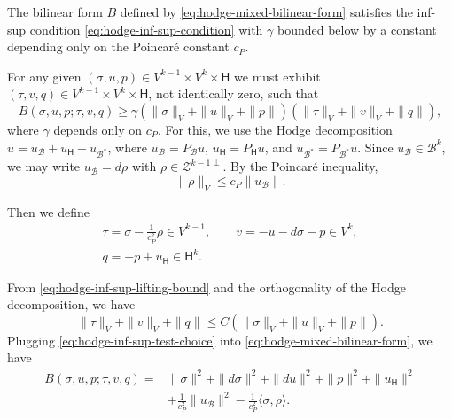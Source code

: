 \begin{Theorem}\label{thm:hodge-mixed-inf-sup}
{The bilinear form $B$ defined by \eqref{eq:hodge-mixed-bilinear-form} satisfies the inf-sup condition \eqref{eq:hodge-inf-sup-condition} with $\gamma$ bounded below by a constant depending only on the Poincaré constant $c_P$.}
\end{Theorem}

\begin{Proof}
{For any given $(\sigma,u,p)\in V^{k-1}\times V^k\times\mathsf H$ we must exhibit $(\tau,v,q)\in V^{k-1}\times V^k\times\mathsf H$, not identically zero, such that}
\[
B(\sigma,u,p;\tau,v,q)\geq\gamma(\|\sigma\|_V+\|u\|_V+\|p\|)(\|\tau\|_V+\|v\|_V+\|q\|),
\]
{where $\gamma$ depends only on $c_P$. For this, we use the Hodge decomposition $u=u_{\mathcal B}+u_{\mathsf H}+u_{\mathcal B^*}$, where $u_{\mathcal B}=P_{\mathcal B}u$, $u_{\mathsf H}=P_{\mathsf H}u$, and $u_{\mathcal B^*}=P_{\mathcal B^*}u$. Since $u_{\mathcal B}\in\mathcal B^k$, we may write $u_{\mathcal B}=d\rho$ with $\rho\in\mathcal Z^{k-1\perp}$. By the Poincaré inequality,}
\begin{equation}\label{eq:hodge-inf-sup-lifting-bound}
\|\rho\|_V\leq c_P\|u_{\mathcal B}\|.
\end{equation}

{Then we define}
\begin{equation}\label{eq:hodge-inf-sup-test-choice}
\begin{gathered}
\tau=\sigma-\frac{1}{c_P^2}\rho\in V^{k-1},\qquad v=-u-d\sigma-p\in V^k,\\
q=-p+u_{\mathsf H}\in\mathsf H^k.
\end{gathered}
\end{equation}

{From \eqref{eq:hodge-inf-sup-lifting-bound} and the orthogonality of the Hodge decomposition, we have}
\begin{equation}\label{eq:hodge-inf-sup-test-bound}
\|\tau\|_V+\|v\|_V+\|q\|\leq C(\|\sigma\|_V+\|u\|_V+\|p\|).
\end{equation}
{Plugging \eqref{eq:hodge-inf-sup-test-choice} into \eqref{eq:hodge-mixed-bilinear-form}, we have}
\[
\begin{aligned}
B(\sigma,u,p;\tau,v,q)={}&\|\sigma\|^2+\|d\sigma\|^2+\|du\|^2+\|p\|^2+\|u_{\mathsf H}\|^2\\
&+\frac{1}{c_P^2}\|u_{\mathcal B}\|^2-\frac{1}{c_P^2}\langle\sigma,\rho\rangle.
\end{aligned}
\]


\end{Proof}
